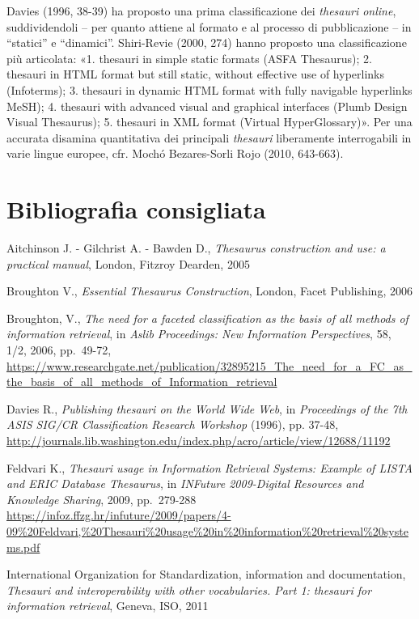 \documentclass[
  b5paper,
  twoside,
  12pt,
  chapterprefix=false,
  bibliography=totocnumbered,
  parskip=false]{scrbook}
\begin{document}
Davies (1996, 38-39) ha proposto una prima classificazione dei \emph{thesauri
online}, suddividendoli -- per quanto attiene al formato e al processo
di pubblicazione -- in \enquote{statici} e \enquote{dinamici}. Shiri-Revie (2000, 274)
hanno proposto una classificazione più articolata: «1. thesauri in
simple static formats (ASFA Thesaurus); 2. thesauri in HTML format but
still static, without effective use of hyperlinks (Infoterms); 3.
thesauri in dynamic HTML format with fully navigable hyperlinks MeSH);
4. thesauri with advanced visual and graphical interfaces (Plumb Design
Visual Thesaurus); 5. thesauri in XML format (Virtual HyperGlossary)».
Per una accurata disamina quantitativa dei principali \emph{thesauri}
liberamente interrogabili in varie lingue europee, cfr. Mochó
Bezares-Sorli Rojo (2010, 643-663).

\hypertarget{bibliografia-consigliata-25}{%
\section*{Bibliografia consigliata}\label{bibliografia-consigliata-25}}

Aitchinson J. - Gilchrist A. - Bawden D., \emph{Thesaurus construction and
use: a practical manual}, London, Fitzroy Dearden, 2005

Broughton V., \emph{Essential Thesaurus Construction}, London, Facet
Publishing, 2006

Broughton, V., \emph{The need for a faceted classification as the basis of
all methods of information retrieval}, in \emph{Aslib Proceedings: New
Information Perspectives}, 58, 1/2, 2006, pp.~49-72,
\url{https://www.researchgate.net/publication/32895215_The_need_for_a_FC_as_the_basis_of_all_methods_of_Information_retrieval}

Davies R., \emph{Publishing thesauri on the World Wide Web}, in \emph{Proceedings
of the 7th ASIS SIG/CR Classification Research Workshop} (1996), pp.
37-48,
\url{http://journals.lib.washington.edu/index.php/acro/article/view/12688/11192}

Feldvari K., \emph{Thesauri usage in Information Retrieval Systems: Example
of LISTA and ERIC Database Thesaurus}, in \emph{INFuture 2009-Digital
Resources and Knowledge Sharing}, 2009, pp.~279-288
\url{https://infoz.ffzg.hr/infuture/2009/papers/4-09\%20Feldvari,\%20Thesauri\%20usage\%20in\%20information\%20retrieval\%20systems.pdf}

International Organization for Standardization, information and
documentation, \emph{Thesauri and interoperability with other vocabularies.
Part 1: thesauri for information retrieval}, Geneva, ISO, 2011
\end{document}
